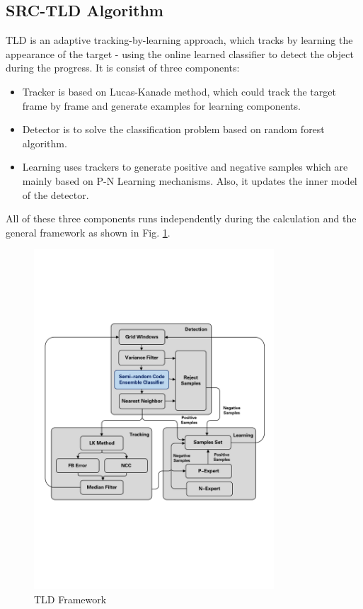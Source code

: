 \subsection{SRC-TLD Algorithm}
TLD\cite{kalal2012tracking} is an adaptive tracking-by-learning approach, which tracks by learning the appearance of the target - using the online learned classifier to detect the object during the progress. It is consist of three components: 
\begin{itemize}
	\item Tracker is based on Lucas-Kanade method, which could track the target frame by frame and generate examples for learning components.
	
	\item Detector is to solve the classification problem based on random forest algorithm.
	
	\item Learning uses trackers to generate positive and negative samples which are mainly based on P-N Learning mechanisms. Also, it updates the inner model of the detector.
\end{itemize}
All of these three components runs independently during the calculation and the general framework as shown in Fig. \ref{fig:sci03_tld_framework}.

\begin{figure}[!th]
	\centering
	\includegraphics[width=0.8\textwidth]{Figs/sci03_tld_framework.pdf}	
	\caption{TLD Framework}
	\label{fig:sci03_tld_framework}
\end{figure}


